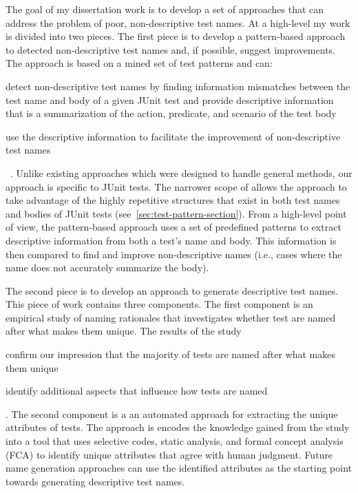 The goal of my dissertation work is to develop a set of approaches that can address the problem of poor, non-descriptive test names.
%
At a high-level my work is divided into two pieces.
%
The first piece is to develop a pattern-based approach to detected non-descriptive test names and, if possible, suggest improvements.
%
The approach is based on a mined set of test patterns and can:
%
\begin{enumerate*}
\item detect non-descriptive test names by finding information mismatches between the test name and body of a given JUnit test and provide descriptive information that is a summarization of the action, predicate, and scenario of the test body
\item use the descriptive information to facilitate the improvement of non-descriptive test names
\end{enumerate*}~\cite{wu2020pattern}.
%
Unlike existing approaches which were designed to handle general methods, our approach is specific to JUnit tests.
%
The narrower scope of allows the approach to take advantage of the highly repetitive structures that exist in both test names and bodies of JUnit tests (see~\cref{sec:test-pattern-section}).
%
From a high-level point of view, the pattern-based approach uses a set of predefined patterns to extract descriptive information from both a test's name and body.
%
This information is then compared to find and improve non-descriptive names (i.e., cases where the name does not accurately summarize the body).


The second piece is to develop an approach to generate descriptive test names.
This piece of work contains three components.
%
The first component is an empirical study of naming rationales that investigates whether test are named after what makes them unique.
%
The results of the study
\begin{enumerate*}
\item confirm our impression that the majority of tests are named after what makes them unique
\item identify additional aspects that influence how tests are named
\end{enumerate*}.
%
The second component is a an automated approach for extracting the unique attributes of tests.
The approach is encodes the knowledge gained from the study into a tool that uses selective codes, static analysis, and formal concept analysis (FCA) to identify unique attributes that agree with human judgment.
%
Future name generation approaches can use the identified attributes as the starting point towards generating descriptive test names.


